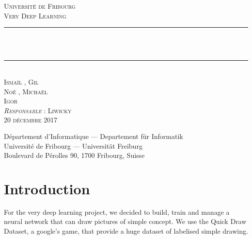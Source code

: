\documentclass[
  10pt, 
  a4paper,
  oneside, 
  headinclude, 
  footinclude, 
  BCOR5mm, 
]{scrartcl}
\newcommand{\HRule}{\rule{\linewidth}{0.5mm}}
\begin{document}

\begin{titlepage}
  \begin{sffamily}
  \begin{center}
    \textsc{\LARGE Université de Fribourg} \\ [2cm]
    \textsc{\Large Very Deep Learning} \\ [2cm]

    \HRule \\ [0.5cm]
    {\huge{} \\ [0.5cm]}
    \HRule \\ [2cm]
    
    \textsc{
    	\Large Ismaïl , 
    	\Large Gil  \\
    	\Large Noé , 
    	\Large Michaël  \\
    	\Large Igor } \\ [2cm]
    
    \textsc{\large \emph{Responsable} : Liwicky } \\ [0.5cm]
    \textsc{\Large 20 décembre 2017} \\    

    \vfill

    Département d’Informatique — Departement für Informatik \\
    Université de Fribourg — Universität Freiburg \\
    Boulevard de Pérolles 90, 1700 Fribourg, Suisse
  \end{center}
  \end{sffamily}
\end{titlepage}

\newpage


\section{Introduction}

For the very deep learning project, we decided to build, train and manage a neural network that can draw pictures of simple concept. We use the Quick Draw Dataset, a google's game, that provide a huge dataset of labelised simple drawing.
\end{document}
